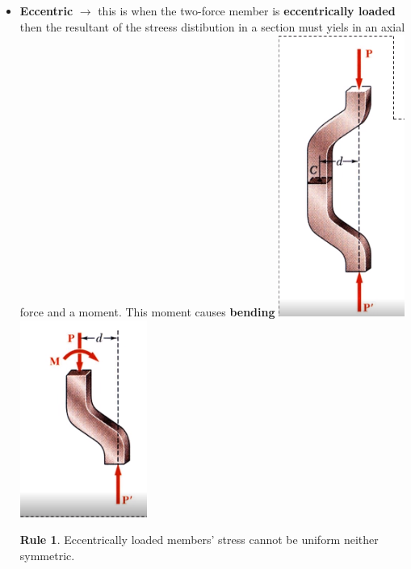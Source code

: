 \documentclass[11pt]{article}
\theoremstyle{definition}
\newtheorem{reg}{Rule}
\begin{document}
\begin{itemize}
\item \textbf{Eccentric} $\to$ this is when the two-force member is \textbf{eccentrically loaded} then the resultant of the streess distibution in a section must yiels in an axial force and a moment. This moment causes \textbf{bending}  \includegraphics[scale=0.5]{figures/2021-03-30_22-22.png} \includegraphics[scale=0.5]{figures/2021-03-30_22-22_1.png}
\begin{reg}
Eccentrically loaded members' stress cannot be uniform neither symmetric.
\end{reg}
\end{itemize}
\end{document}
